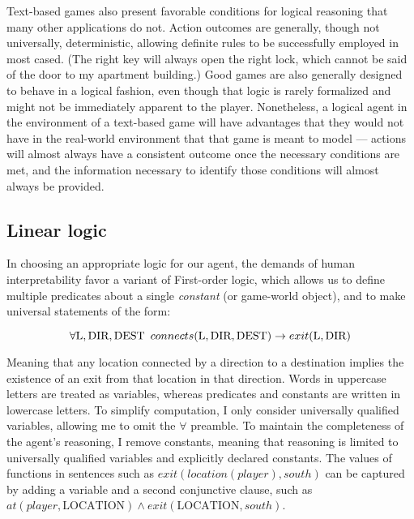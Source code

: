 Text-based games also present favorable conditions for logical reasoning
that many other applications do not. Action outcomes are generally,
though not universally, deterministic, allowing definite rules to be
successfully employed in most cased. (The right key will always open the
right lock, which cannot be said of the door to my apartment building.)
Good games are also generally designed to behave in a logical fashion,
even though that logic is rarely formalized and might not be immediately
apparent to the player. Nonetheless, a logical agent in the environment of a
text-based game will have advantages that they would not have in the
real-world environment that that game is meant to model --- actions will
almost always have a consistent outcome once the necessary conditions
are met, and the information necessary to identify those conditions will
almost always be provided.\footnotemark


\subsection{Linear logic}

In choosing an appropriate logic for our agent, the demands of human
interpretability favor a variant of First-order logic, which allows us
to define multiple predicates about a single \emph{constant} (or
game-world object), and to make universal statements of the form:

\[
    \forall \text{L}, \text{DIR}, \text{DEST}\hskip.5em
    connects(\text{L}, \text{DIR}, \text{DEST})
    \to exit(\text{L}, \text{DIR})
\]

Meaning that any location connected by a direction to a destination
implies the existence of an exit from that location in that direction.
Words in uppercase letters are treated as variables, whereas predicates
and constants are written in lowercase letters. To simplify computation,
I only consider universally qualified variables, allowing me to omit the
$\forall$ preamble. To maintain the completeness of the agent's
reasoning, I remove constants, meaning that reasoning is limited to
universally qualified variables and explicitly declared constants.
The values of functions in sentences such as $exit(location(player),
south)$ can be captured by adding a variable and a second conjunctive
clause, such as $at(player, \text{LOCATION}) \land exit(\text{LOCATION},
south)$.

